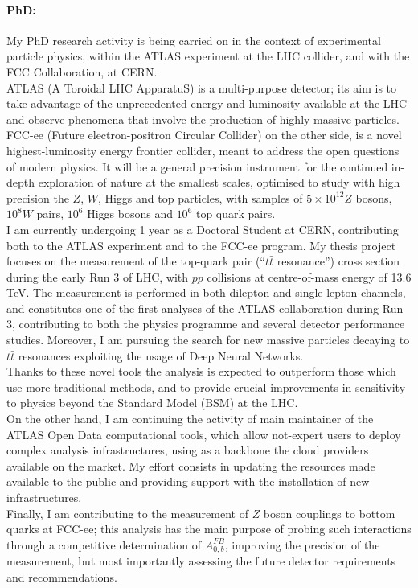 \documentclass[10pt]{article} %
\begin{document}
\paragraph{PhD:} My PhD research activity is being carried on in the context of experimental particle physics, within the ATLAS experiment at the LHC collider, and with the FCC Collaboration, at CERN. \\
ATLAS (A Toroidal LHC ApparatuS) is a multi-purpose detector; its aim is to take advantage of the unprecedented energy and luminosity available at the LHC and observe phenomena that involve the production of highly massive particles. \\
FCC-ee (Future electron-positron Circular Collider) on the other side, is a novel highest-luminosity energy frontier collider, meant to address the open questions of modern physics. It will be a general precision instrument for the continued in-depth exploration of nature at the smallest scales, optimised to study with high precision the $Z$, $W$, Higgs and top particles, with samples of $5 \times 10^{12} Z$ bosons, $10^8 W$ pairs, $10^6$ Higgs bosons and $10^6$ top quark pairs. \\
I am currently undergoing 1 year as a Doctoral Student at CERN, contributing both to the ATLAS experiment and to the FCC-ee program.
My thesis project focuses on the measurement of the top-quark pair (``$t\bar{t}$  resonance'') cross section during the early Run 3 of LHC, with $pp$ collisions at centre-of-mass energy of 13.6 TeV. The measurement is performed in both dilepton and single lepton channels, and constitutes one of the first analyses of the ATLAS collaboration during Run 3, contributing to both the physics programme and several detector performance studies. Moreover, I am pursuing the search for new massive particles decaying to $t\bar{t}$  resonances exploiting the usage of Deep Neural Networks. \\
Thanks to these novel tools the analysis is expected to outperform those which use more traditional methods, and to provide crucial improvements in sensitivity to physics beyond the Standard Model (BSM) at the LHC. \\
On the other hand, I am continuing the activity of main maintainer of the ATLAS Open Data computational tools, which allow not-expert users to deploy complex analysis infrastructures, using as a backbone the cloud providers available on the market. My effort consists in updating the resources made available to the public and providing support with the installation of new infrastructures.\\
Finally, I am contributing to the measurement of $Z$ boson couplings to bottom quarks at FCC-ee; this analysis has the main purpose of probing such interactions through a competitive determination of $A_{0,b}^{FB}$, improving the precision of the measurement, but most importantly assessing the future detector requirements and recommendations. \\ \\
\end{document}
